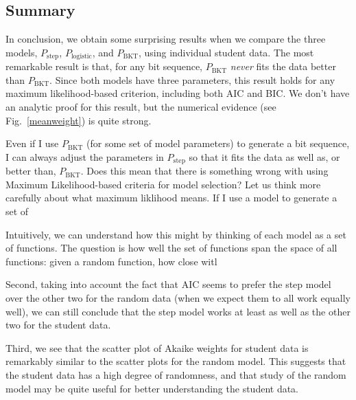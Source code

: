 \documentclass{acmlarge-edm}
\begin{document}
\subsection{Summary}

In conclusion, we obtain some surprising results when we compare
the three models,  $P_\mathrm{step}$, $P_\mathrm{logistic}$, and
$P_\mathrm{BKT}$, using individual student data.  The most remarkable 
result is that, for any bit
sequence,  $P_\mathrm{BKT}$ {\em never} fits the data better than $P_\mathrm{BKT}$.  Since 
both models have three parameters, this result holds for any maximum
likelihood-based criterion, including both AIC and BIC.  We don't have
an analytic proof for this result, 
but the numerical evidence (see Fig.~\ref{meanweight}) is quite strong.


Even if I use $P_\mathrm{BKT}$ (for some set of model parameters) 
to generate a bit sequence, I can
always adjust the parameters in $P_\mathrm{step}$ so that it
fits the data as well as, or better than, $P_\mathrm{BKT}$.
Does this mean that there is something wrong with using Maximum 
Likelihood-based criteria for model selection?  Let us think
more carefully about what maximum liklihood means.
If I use a model to generate a set of 

Intuitively, we can understand how this might by thinking of 
each model as a set of functions.  The question is how well the
set of functions span the space of all functions:  given a random
function, how close witl

Second, taking into account the fact that AIC seems to prefer the step model over the other
two for the random data (when we expect them to all work equally
well), we can still conclude that the step model works at least as
well as the other two for the student data.

Third, we see that the scatter plot of Akaike weights for student
data is remarkably similar to the scatter plots for the random model.
This suggests that the student data has a high degree of randomness,
and that study of the random model may be quite useful for better
understanding the student data.
\end{document}
